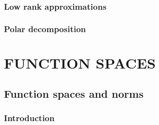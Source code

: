 \documentclass[a4paper,twoside]{article}
\theoremstyle{definition}
\theoremstyle{plain}
\begin{document}
\subsubsection{Low rank approximations}
\subsubsection{Polar decomposition}

\section{FUNCTION SPACES}
\subsection{Function spaces and norms}
\subsubsection{Introduction}




\end{document}
